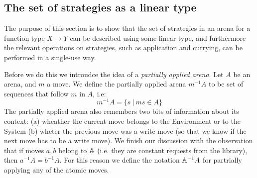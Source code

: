 \subsection{The set of strategies as a linear type}
The purpose of this section is to show that the set of strategies in an arena for a function type $X \to Y$ can be described using some linear type, and furthermore the relevant operations on strategies, such as application and currying, can be performed in a single-use way.

Before we do this we introudce the idea of a \emph{partially applied arena}.
Let $A$ be an arena, and $m$ a move. We define the partially applied arena ${m^{-1}}A$ 
to be set of sequences that follow $m$ in $A$, i.e:
\[m^{-1}A = \{s \ | \ ms \in A \}\]
The partially applied arena also remembers two bits of information about its context: (a) wheather the current move belongs to the Environment or to the System
(b) wheter the previous move was a write move (so that we know if the next move has to be a write move). We finish our discussion with the observation 
that if moves $a, b$ belong to $\mathbb A$ (i.e. they are constant requests from the library), then $a^{-1}A = b^{-1}A$. 
For this reason we define the notation $\mathbb A^{-1}A$ for partrially applying any of the atomic moves. 


